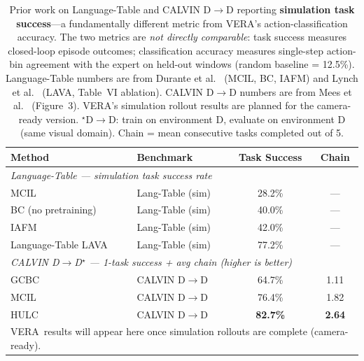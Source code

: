 \documentclass{article}
\renewcommand{\arraystretch}{1.25}
\newcommand{\modelname}{\textsc{VERA}\xspace}
\begin{document}
\begin{table}[h]
\centering
\caption{Prior work on Language-Table and CALVIN D$\to$D reporting
  \textbf{simulation task success}---a fundamentally different metric from
  \modelname's action-classification accuracy.
  The two metrics are \emph{not directly comparable}: task success measures
  closed-loop episode outcomes; classification accuracy measures single-step
  action-bin agreement with the expert on held-out windows (random baseline = 12.5\%).
  Language-Table numbers are from Durante et al.~\citep{durante2024agent} (MCIL, BC, IAFM)
  and Lynch et al.~\citep{lynch2023languagetable} (LAVA, Table~VI ablation).
  CALVIN D$\to$D numbers are from Mees et al.~\citep{mees2022hulc} (Figure~3).
  \modelname's simulation rollout results are planned for the camera-ready version.
  $^\star$D$\to$D: train on environment D, evaluate on environment D (same visual domain).
  Chain = mean consecutive tasks completed out of 5.}
\label{tab:prior_lt_calvin}
\small
\setlength{\tabcolsep}{4pt}
\renewcommand{\arraystretch}{1.2}
\begin{tabular}{llcc}
\toprule
\textbf{Method} & \textbf{Benchmark} & \textbf{Task Success} & \textbf{Chain} \\
\midrule
\multicolumn{4}{l}{\textit{Language-Table — simulation task success rate~\citep{durante2024agent,lynch2023languagetable}}} \\
MCIL~\citep{durante2024agent}
  & Lang-Table (sim) & 28.2\% & — \\
BC (no pretraining)~\citep{durante2024agent}
  & Lang-Table (sim) & 40.0\% & — \\
IAFM~\citep{durante2024agent}
  & Lang-Table (sim) & 42.0\% & — \\
Language-Table LAVA~\citep{lynch2023languagetable}
  & Lang-Table (sim) & 77.2\% & — \\
\midrule
\multicolumn{4}{l}{\textit{CALVIN D$\to$D$^\star$ — 1-task success + avg chain (higher is better)~\citep{mees2022hulc}}} \\
GCBC~\citep{mees2022hulc}
  & CALVIN D$\to$D & 64.7\% & 1.11 \\
MCIL~\citep{mees2022hulc}
  & CALVIN D$\to$D & 76.4\% & 1.82 \\
HULC~\citep{mees2022hulc}
  & CALVIN D$\to$D & \textbf{82.7\%} & \textbf{2.64} \\
\bottomrule
\multicolumn{4}{l}{\footnotesize \modelname\ results will appear here once simulation rollouts are complete (camera-ready).} \\
\end{tabular}
\end{table}
\end{document}
